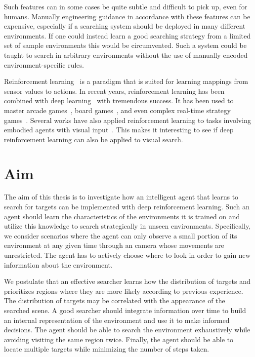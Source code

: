 Such features can in some cases be quite subtle and difficult to pick up, even for humans.
Manually engineering guidance in accordance with these features can be expensive,
especially if a searching system should be deployed in many different environments.
If one could instead learn a good searching strategy from a limited set of sample environments this would be circumvented.
Such a system could be taught to search in arbitrary environments without the use of manually encoded environment-specific rules.

Reinforcement learning~\cite{sutton_reinforcement_2018} is a paradigm that is suited for learning mappings from sensor values to actions.
In recent years, reinforcement learning has been combined with deep learning~\cite{goodfellow_deep_2016} with tremendous success.
It has been used to master arcade games~\cite{mnih_human_2015}, board games~\cite{silver_alphago_2016}, and even complex real-time strategy games~\cite{vinyals_alphastar_2019}.
Several works have also applied reinforcement learning to tasks involving embodied agents with visual input~\cite{minut_mahadevan_2001,mnih_attention_2014,zhu_target_2016,mirowski_navigate_2017}.
This makes it interesting to see if deep reinforcement learning can also be applied to visual search.

\section{Aim}
\label{sec:aim}

The aim of this thesis is to investigate how an intelligent agent that learns to search for targets can be implemented with deep reinforcement learning.
Such an agent should learn the characteristics of the environments it is trained on and utilize this knowledge to search strategically in unseen environments.
Specifically, we consider scenarios where the agent can only observe a small portion of its environment at any given time through an camera whose movements are unrestricted.
The agent has to actively choose where to look in order to gain new information about the environment.

We postulate that an effective searcher learns how the distribution of targets and prioritizes regions where they are more likely according to previous experience.
The distribution of targets may be correlated with the appearance of the searched scene.
A good searcher should integrate information over time to build an internal representation of the environment and use it to make informed decisions.
The agent should be able to search the environment exhaustively while avoiding visiting the same region twice.
Finally, the agent should be able to locate multiple targets while minimizing the number of steps taken.

